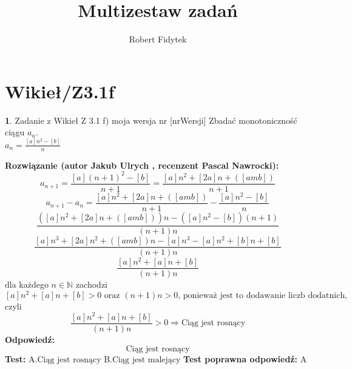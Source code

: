 \documentclass[12pt, a4paper]{article}
\title{Multizestaw zadań}
\author{Robert Fidytek}
\date{}
\theoremstyle{definition} %
\newtheorem{zad}{}
\newcommand{\kategoria}[1]{\section{#1}} %
\newcommand{\zadStart}[1]{\begin{zad}#1\newline} %
\newcommand{\zadStop}{\end{zad}}   %
\newcommand{\rozwStart}[2]{\noindent \textbf{Rozwiązanie (autor #1 , recenzent #2): }\newline} %
\newcommand{\rozwStop}{\newline}                                            %
\newcommand{\odpStart}{\noindent \textbf{Odpowiedź:}\newline}    %
\newcommand{\odpStop}{\newline}                                             %
\newcommand{\testStart}{\noindent \textbf{Test:}\newline} %
\newcommand{\testStop}{\newline} %
\newcommand{\kluczStart}{\noindent \textbf{Test poprawna odpowiedź:}\newline} %
\newcommand{\kluczStop}{\newline} %
\begin{document}
\maketitle


\kategoria{Wikieł/Z3.1f}
\zadStart{Zadanie z Wikieł Z 3.1 f) moja wersja nr [nrWersji]}
Zbadać monotoniczność ciągu $a_{n}$.\\ $a_{n}=\frac{[a]n^{2}-[b]}{n}$
\zadStop
\rozwStart{Jakub Ulrych}{Pascal Nawrocki}
$$a_{n+1}=\frac{[a](n+1)^{2}-[b]}{n+1}=\frac{[a]n^{2}+[2a]n+([amb])}{n+1}$$
$$a_{n+1}-a_{n}=\frac{[a]n^{2}+[2a]n+([amb])}{n+1}-\frac{[a]n^{2}-[b]}{n}$$
$$\frac{([a]n^{2}+[2a]n+([amb]))n-([a]n^{2}-[b])(n+1)}{(n+1)n}$$
$$\frac{[a]n^{3}+[2a]n^{2}+([amb])n-[a]n^{3}-[a]n^{2}+[b]n+[b]}{(n+1)n}$$
$$\frac{[a]n^{2}+[a]n+[b]}{(n+1)n}$$
dla każdego $n\in\mathbb{N}$ zachodzi
$$[a]n^{2}+[a]n+[b]>0 \text{ oraz } (n+1)n>0\text{,  ponieważ jest to dodawanie liczb dodatnich,}$$
czyli
$$\frac{[a]n^{2}+[a]n+[b]}{(n+1)n}>0\Rightarrow \text{Ciąg jest rosnący}$$
\rozwStop
\odpStart
$$\text{Ciąg jest rosnący}$$
\odpStop
\testStart
A.$\text{Ciąg jest rosnący}$
B.$\text{Ciąg jest malejący}$
\testStop
\kluczStart
A
\kluczStop
\end{document}
